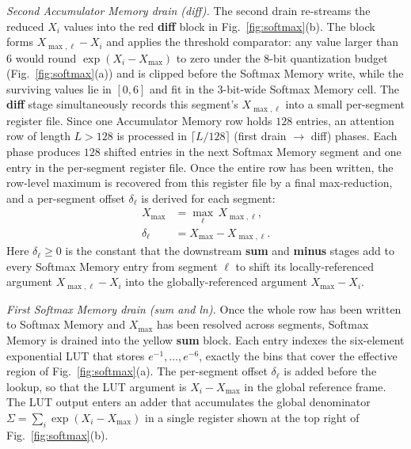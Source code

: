 \documentclass[lettersize,journal]{IEEEtran}
\begin{document}
\emph{Second Accumulator Memory drain (diff).} The second drain re-streams the reduced $X_i$ values into the red \textbf{diff} block in Fig.~\ref{fig:softmax}(b). The block forms $X_{\max,\ell} - X_i$ and applies the threshold comparator: any value larger than $6$ would round $\exp(X_i - X_{\max})$ to zero under the 8-bit quantization budget (Fig.~\ref{fig:softmax}(a)) and is clipped before the Softmax Memory write, while the surviving values lie in $[0, 6]$ and fit in the $3$-bit-wide Softmax Memory cell. The \textbf{diff} stage simultaneously records this segment's $X_{\max,\ell}$ into a small per-segment register file. Since one Accumulator Memory row holds $128$ entries, an attention row of length $L > 128$ is processed in $\lceil L/128 \rceil$ %
(first drain $\rightarrow$ diff) phases. Each phase produces $128$ shifted entries in the next Softmax Memory segment and one entry in the per-segment register file. Once the entire row has been written, the row-level maximum is recovered from this register file by a final max-reduction, and a per-segment offset $\delta_{\ell}$ is derived for each segment:
\begin{align}
    X_{\max}      &= \max_{\ell}\, X_{\max,\ell}, \label{eq:softmax-xmax}\\
    \delta_{\ell} &= X_{\max} - X_{\max,\ell}. \label{eq:softmax-delta}
\end{align}
Here $\delta_{\ell} \ge 0$ is the constant that the downstream \textbf{sum} and \textbf{minus} stages add to every Softmax Memory entry from segment $\ell$ to shift its locally-referenced argument $X_{\max,\ell}{-}X_i$ into the globally-referenced argument $X_{\max}{-}X_i$.

\emph{First Softmax Memory drain (sum and ln).} Once the whole row has been written to Softmax Memory and $X_{\max}$ has been resolved across segments, Softmax Memory is drained into the yellow \textbf{sum} block. Each entry indexes the six-element exponential LUT that stores $e^{-1},\dots,e^{-6}$, exactly the bins that cover the effective region of Fig.~\ref{fig:softmax}(a). The per-segment offset $\delta_{\ell}$ is added before the lookup, so that the LUT argument is $X_i - X_{\max}$ in the global reference frame. The LUT output enters an adder that accumulates the global denominator $\Sigma = \sum_i \exp(X_i - X_{\max})$ in a single register shown at the top right of Fig.~\ref{fig:softmax}(b).
\end{document}
